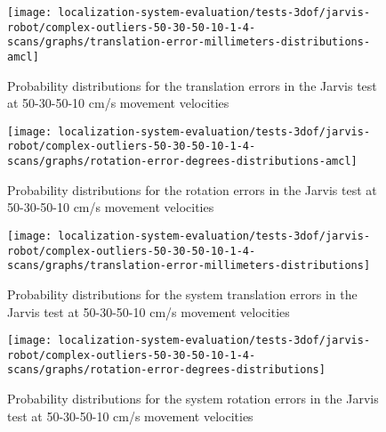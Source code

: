 \begin{figure}[H]
	\centering
	\begin{minipage}[H]{0.47\textwidth}
		\centering
		\texttt{[image: localization-system-evaluation/tests-3dof/jarvis-robot/complex-outliers-50-30-50-10-1-4-scans/graphs/translation-error-millimeters-distributions-amcl]}
		\caption{Probability distributions for the  translation errors in the Jarvis test at 50-30-50-10 cm/s movement velocities}
		\label{fig:localization-system-evaluation_complex-path-with-outliers-50-30-50-10cm-per-sec-velocity-1-4-translation-error-amcl}
	\end{minipage}\hfill
	\begin{minipage}[H]{0.47\textwidth}
		\centering
		\texttt{[image: localization-system-evaluation/tests-3dof/jarvis-robot/complex-outliers-50-30-50-10-1-4-scans/graphs/rotation-error-degrees-distributions-amcl]}
		\caption{Probability distributions for the  rotation errors in the Jarvis test at 50-30-50-10 cm/s movement velocities}
		\label{fig:localization-system-evaluation_complex-path-with-outliers-50-30-50-10cm-per-sec-velocity-1-4-rotation-error-amcl}
	\end{minipage}
\end{figure}

\begin{figure}[H]
	\centering
	\begin{minipage}[H]{0.47\textwidth}
		\centering
		\texttt{[image: localization-system-evaluation/tests-3dof/jarvis-robot/complex-outliers-50-30-50-10-1-4-scans/graphs/translation-error-millimeters-distributions]}
		\caption{Probability distributions for the  system translation errors in the Jarvis test at 50-30-50-10 cm/s movement velocities}
		\label{fig:localization-system-evaluation_complex-path-with-outliers-50-30-50-10cm-per-sec-velocity-1-4-translation-error}
	\end{minipage}\hfill
	\begin{minipage}[H]{0.47\textwidth}
		\centering
		\texttt{[image: localization-system-evaluation/tests-3dof/jarvis-robot/complex-outliers-50-30-50-10-1-4-scans/graphs/rotation-error-degrees-distributions]}
		\caption{Probability distributions for the  system rotation errors in the Jarvis test at 50-30-50-10 cm/s movement velocities}
		\label{fig:localization-system-evaluation_complex-path-with-outliers-50-30-50-10cm-per-sec-velocity-1-4-rotation-error}
	\end{minipage}
\end{figure}



